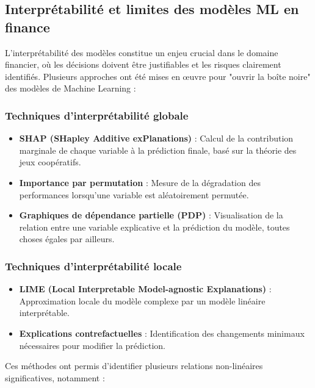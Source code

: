 \subsection{Interprétabilité et limites des modèles ML en finance}

L'interprétabilité des modèles constitue un enjeu crucial dans le domaine financier, où les décisions doivent être justifiables et les risques clairement identifiés. Plusieurs approches ont été mises en œuvre pour "ouvrir la boîte noire" des modèles de Machine Learning :

\subsubsection{Techniques d'interprétabilité globale}
\begin{itemize}
  \item \textbf{SHAP (SHapley Additive exPlanations)} : Calcul de la contribution marginale de chaque variable à la prédiction finale, basé sur la théorie des jeux coopératifs.
  \item \textbf{Importance par permutation} : Mesure de la dégradation des performances lorsqu'une variable est aléatoirement permutée.
  \item \textbf{Graphiques de dépendance partielle (PDP)} : Visualisation de la relation entre une variable explicative et la prédiction du modèle, toutes choses égales par ailleurs.
\end{itemize}

\subsubsection{Techniques d'interprétabilité locale}
\begin{itemize}
  \item \textbf{LIME (Local Interpretable Model-agnostic Explanations)} : Approximation locale du modèle complexe par un modèle linéaire interprétable.
  \item \textbf{Explications contrefactuelles} : Identification des changements minimaux nécessaires pour modifier la prédiction.
\end{itemize}

Ces méthodes ont permis d'identifier plusieurs relations non-linéaires significatives, notamment :

